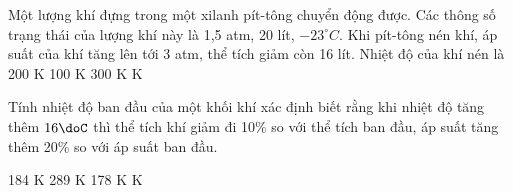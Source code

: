 \begin{vidu} %
	Một lượng khí đựng trong một xilanh pít-tông chuyển động được. Các thông số trạng thái của lượng khí này là 1,5 atm, 20 lít, $-23^\circ C$. Khi pít-tông nén khí, áp suất của khí tăng lên tới 3 atm, thể tích giảm còn 16 lít. Nhiệt độ của khí nén là
	\choice
	{200 K}
	{100 K}
	{300 K}
	{ K}
\end{vidu}
\begin{vidu} %
	Tính nhiệt độ ban đầu của một khối khí xác định biết rằng khi nhiệt độ tăng thêm $16\doC$ thì thể tích khí giảm đi 10\% so với thể tích ban đầu, áp suất tăng thêm 20\% so với áp suất ban đầu.
	
	\choice
	{184 K}
	{289 K}
	{178 K}
	{ K}
\end{vidu}
